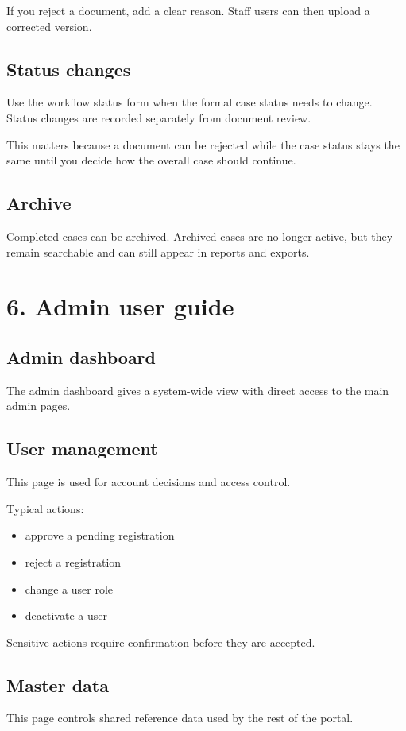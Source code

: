 \documentclass[11pt,a4paper]{article}
\begin{document}
If you reject a document, add a clear reason. Staff users can then upload a corrected version.

\subsection*{Status changes}
Use the workflow status form when the formal case status needs to change. Status changes are recorded separately from document review.

This matters because a document can be rejected while the case status stays the same until you decide how the overall case should continue.

\subsection*{Archive}
Completed cases can be archived. Archived cases are no longer active, but they remain searchable and can still appear in reports and exports.

\section*{6. Admin user guide}
\subsection*{Admin dashboard}
The admin dashboard gives a system-wide view with direct access to the main admin pages.

\subsection*{User management}
This page is used for account decisions and access control.

Typical actions:

\begin{itemize}
  \item approve a pending registration
  \item reject a registration
  \item change a user role
  \item deactivate a user
\end{itemize}

Sensitive actions require confirmation before they are accepted.

\subsection*{Master data}
This page controls shared reference data used by the rest of the portal.
\end{document}
